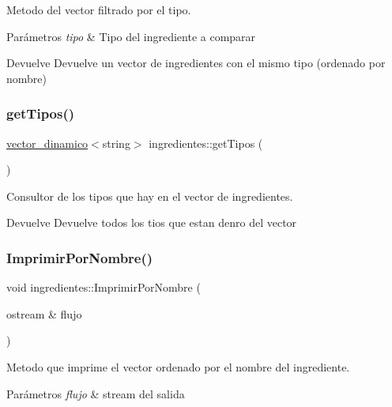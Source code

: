Metodo del vector filtrado por el tipo. 


\begin{DoxyParams}{Parámetros}
{\em tipo} & Tipo del ingrediente a comparar \\
\hline
\end{DoxyParams}
\begin{DoxyReturn}{Devuelve}
Devuelve un vector de ingredientes con el mismo tipo (ordenado por nombre) 
\end{DoxyReturn}
\mbox{\label{classingredientes_a4fc149d674b55f73c3079d58606e7e1c}} 
\subsubsection{\texorpdfstring{get\+Tipos()}{getTipos()}}
{\footnotesize\ttfamily \hyperlink{classvector__dinamico}{vector\+\_\+dinamico}$<$string$>$ ingredientes\+::get\+Tipos (\begin{DoxyParamCaption}{ }\end{DoxyParamCaption})}



Consultor de los tipos que hay en el vector de ingredientes. 

\begin{DoxyReturn}{Devuelve}
Devuelve todos los tios que estan denro del vector 
\end{DoxyReturn}
\mbox{\label{classingredientes_adefafd151edf8a8997bca2dc22057ece}} 
\subsubsection{\texorpdfstring{Imprimir\+Por\+Nombre()}{ImprimirPorNombre()}}
{\footnotesize\ttfamily void ingredientes\+::\+Imprimir\+Por\+Nombre (\begin{DoxyParamCaption}\item[{ostream \&}]{flujo }\end{DoxyParamCaption})}



Metodo que imprime el vector ordenado por el nombre del ingrediente. 


\begin{DoxyParams}{Parámetros}
{\em flujo} & stream del salida \\
\hline
\end{DoxyParams}
\mbox{\label{classingredientes_a683d032576cbc230c210aa51cdbcc93e}} 
